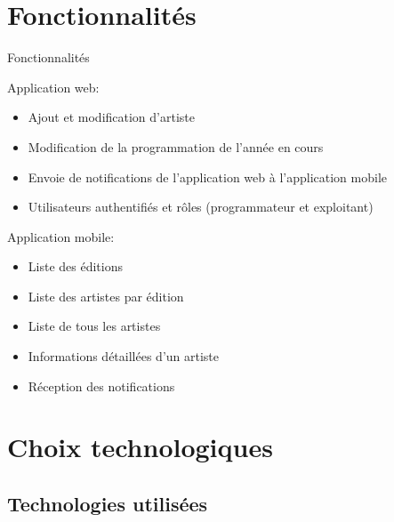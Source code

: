 \documentclass{beamer}
\begin{document}
\section{Fonctionnalités}

\begin{frame}{Fonctionnalités}

Application web:

\begin{itemize}
    \item Ajout et modification d'artiste
    \item Modification de la programmation de l'année en cours
    \item Envoie de notifications de l'application web à l'application mobile
    \item Utilisateurs authentifiés et rôles (programmateur et exploitant)
\end{itemize}

Application mobile:

\begin{itemize}
    \item Liste des éditions
    \item Liste des artistes par édition
    \item Liste de tous les artistes
    \item Informations détaillées d'un artiste
    \item Réception des notifications
\end{itemize}

\end{frame}

\section{Choix technologiques}

\subsection{Technologies utilisées}
\end{document}
